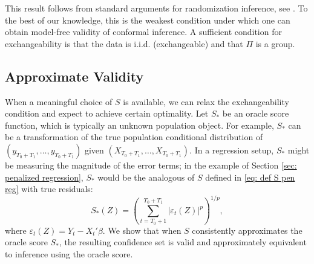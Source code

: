 \documentclass[final,12pt]{colt2018} %
\newcommand{\yinchu}[1]{\textcolor{teal}{Yinchu: #1}}
\newcommand{\KW}[1]{\textcolor{cyan}{KW: #1}}
\begin{document}
This result follows from standard arguments for randomization inference, see \citet{romano1990behavior}. To the best of our knowledge, this is the weakest condition under which one can obtain model-free validity of conformal inference. A sufficient condition for exchangeability is that the data is i.i.d. (exchangeable) and that $\Pi$ is a group.











\subsection{Approximate Validity}
When a meaningful choice of $S$ is available, we can relax the exchangeability condition and expect to achieve certain optimality. Let $S_* $ be an oracle score function, which is typically an unknown population object. For example,  $S_*$ can be a transformation of the true population conditional distribution of $(y_{T_0+T_1},\dots,y_{T_0+T_1}) $ given $ (X_{T_0+T_1},\dots,X_{T_0+T_1}) $. In a regression setup, $S_* $ might be measuring the magnitude of the error terms; in the example of Section \ref{sec: penalized regression}, $S_*$ would be the analogous of $S$ defined in \eqref{eq: def S pen reg} with true residuals:
\begin{equation} \label{eq: example S star}
S_*(Z)=  \left(\sum_{t=T_0+1}^{T_0+T_1} \left|{\varepsilon}_{t}(Z) \right|^p\right)^{1/p},
\end{equation}
where $\varepsilon_t(Z)=Y_t-X_t'\beta$.  We show that when $S$ consistently approximates the oracle score $S_*$, the resulting confidence set is valid and approximately equivalent to inference using the oracle score. 
\end{document}
